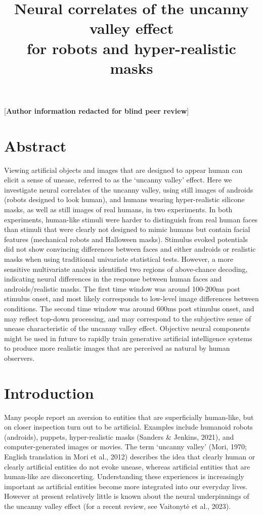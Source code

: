 \documentclass[
]{article}
\title{Neural correlates of the uncanny valley effect\\
for robots and hyper-realistic masks}
\author{}
\date{\vspace{-2.5em}}
\begin{document}
\maketitle

{[}\textbf{Author information redacted for blind peer review}{]}

\section{Abstract}\label{abstract}

Viewing artificial objects and images that are designed to appear human can elicit a sense of unease, referred to as the `uncanny valley' effect. Here we investigate neural correlates of the uncanny valley, using still images of androids (robots designed to look human), and humans wearing hyper-realistic silicone masks, as well as still images of real humans, in two experiments. In both experiments, human-like stimuli were harder to distinguish from real human faces than stimuli that were clearly not designed to mimic humans but contain facial features (mechanical robots and Halloween masks). Stimulus evoked potentials did not show convincing differences between faces and either androids or realistic masks when using traditional univariate statistical tests. However, a more sensitive multivariate analysis identified two regions of above-chance decoding, indicating neural differences in the response between human faces and androids/realistic masks. The first time window was around 100-200ms post stimulus onset, and most likely corresponds to low-level image differences between conditions. The second time window was around 600ms post stimulus onset, and may reflect top-down processing, and may correspond to the subjective sense of unease characteristic of the uncanny valley effect. Objective neural components might be used in future to rapidly train generative artificial intelligence systems to produce more realistic images that are perceived as natural by human observers.

\section{Introduction}\label{introduction}

Many people report an aversion to entities that are superficially human-like, but on closer inspection turn out to be artificial. Examples include humanoid robots (androids), puppets, hyper-realistic masks (Sanders \& Jenkins, 2021), and computer-generated images or movies. The term `uncanny valley' (Mori, 1970; English translation in Mori et al., 2012) describes the idea that clearly human or clearly artificial entities do not evoke unease, whereas artificial entities that are human-like are disconcerting. Understanding these experiences is increasingly important as artificial entities become more integrated into our everyday lives. However at present relatively little is known about the neural underpinnings of the uncanny valley effect (for a recent review, see Vaitonytė et al., 2023).
\end{document}
